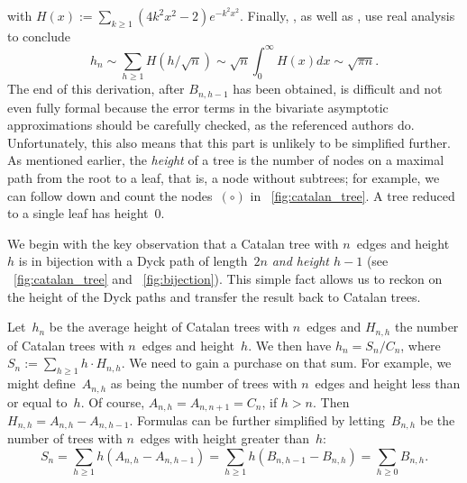 with \(H(x) := \sum_{k \geqslant 1}(4k^2x^2-2)e^{-k^2x^2}\). Finally,
\citet*[5.9]{SedgewickFlajolet_1996}, as well as
\citet*[9.6]{GrahamKnuthPatashnik_1994}, use real analysis to conclude
\begin{equation*}
h_{n} \sim \sum_{h \geqslant 1}H(h/\!\sqrt{n})
\sim \sqrt{n} \int_0^{\infty}\!\!H(x) dx \sim \sqrt{\pi n}.
\end{equation*}
The end of this derivation, after \(B_{n,h-1}\) has been obtained, is
difficult and not even fully formal because the error terms in the
bivariate asymptotic approximations should be carefully checked, as
the referenced authors do. Unfortunately, this also means that this
part is unlikely to be simplified further.
As mentioned earlier, the \emph{height} of a tree is the number of
nodes on a maximal path from the root to a leaf, that is, a node
without subtrees; for example, we can follow down and count the
nodes~\((\circ)\) in \fig~\ref{fig:catalan_tree}. A tree reduced to a
single leaf has height~\(0\).

We begin with the key observation that a Catalan tree with \(n\)~edges
and height~\(h\) is in bijection with a Dyck path of length~\(2n\)
\emph{and height \(h-1\)} (see \fig~\vref{fig:catalan_tree} and
\fig~\ref{fig:bijection}). This simple fact allows us to reckon on the
height of the Dyck paths and transfer the result back to Catalan
trees.

Let~\(h_n\) be the average height of Catalan trees with \(n\)~edges
and \(H_{n,h}\) the number of Catalan trees with \(n\)~edges and
height~\(h\). We then have \(h_n = S_n/C_{n}\), where \(S_n := \sum_{h
  \geqslant 1} h \cdot H_{n,h}\). We need to gain a purchase on that
sum. For example, we might define~\(A_{n,h}\) as being the number of
trees with \(n\)~edges and height less than or equal to~\(h\). Of
course, \(A_{n,h} = A_{n,n+1} = C_{n}\), if \(h > n\). Then \(H_{n,h}
= A_{n,h}-A_{n,h-1}\). Formulas can be further simplified by
letting~\(B_{n,h}\) be the number of trees with \(n\)~edges with
height greater than~\(h\):
\begin{equation}
S_n = \sum_{h \geqslant 1}h(A_{n,h}-A_{n,h-1})
    = \sum_{h \geqslant 1}h(B_{n,h-1}-B_{n,h}) = \sum_{h\geqslant 0} B_{n,h}.
\label{eq:Sn}
\end{equation}

